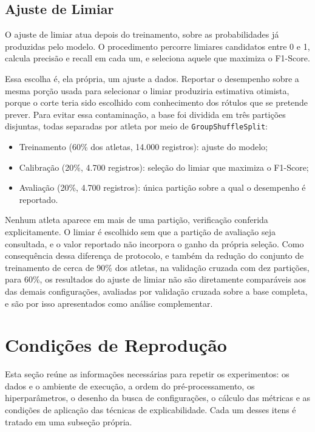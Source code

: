 \subsection{Ajuste de Limiar}

O ajuste de limiar atua depois do treinamento, sobre as probabilidades já produzidas pelo modelo. O procedimento percorre limiares candidatos entre 0 e 1, calcula precisão e recall em cada um, e seleciona aquele que maximiza o F1-Score.

Essa escolha é, ela própria, um ajuste a dados. Reportar o desempenho sobre a mesma porção usada para selecionar o limiar produziria estimativa otimista, porque o corte teria sido escolhido com conhecimento dos rótulos que se pretende prever. Para evitar essa contaminação, a base foi dividida em três partições disjuntas, todas separadas por atleta por meio de \texttt{GroupShuffleSplit}:

\begin{itemize}
    \item Treinamento (60\% dos atletas, 14.000 registros): ajuste do modelo;
    \item Calibração (20\%, 4.700 registros): seleção do limiar que maximiza o F1-Score;
    \item Avaliação (20\%, 4.700 registros): única partição sobre a qual o desempenho é reportado.
\end{itemize}

Nenhum atleta aparece em mais de uma partição, verificação conferida explicitamente. O limiar é escolhido sem que a partição de avaliação seja consultada, e o valor reportado não incorpora o ganho da própria seleção. Como consequência dessa diferença de protocolo, e também da redução do conjunto de treinamento de cerca de 90\% dos atletas, na validação cruzada com dez partições, para 60\%, os resultados do ajuste de limiar não são diretamente comparáveis aos das demais configurações, avaliadas por validação cruzada sobre a base completa, e são por isso apresentados como análise complementar.

\section{Condições de Reprodução}
\label{sec:reprodutibilidade}

Esta seção reúne as informações necessárias para repetir os experimentos: os dados e o ambiente de execução, a ordem do pré-processamento, os hiperparâmetros, o desenho da busca de configurações, o cálculo das métricas e as condições de aplicação das técnicas de explicabilidade. Cada um desses itens é tratado em uma subseção própria.

